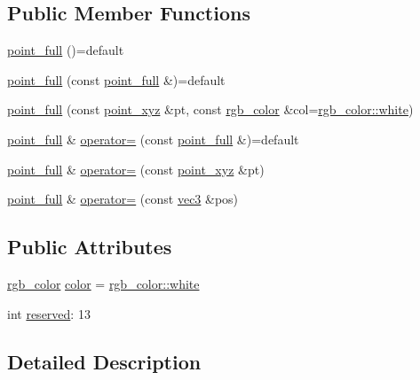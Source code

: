 \subsection*{Public Member Functions}
\begin{DoxyCompactItemize}
\item 
\hyperlink{structtlz_1_1point__full_ad3a06951660b913ae1241dec5958fab0}{point\+\_\+full} ()=default
\item 
\hyperlink{structtlz_1_1point__full_a4441cf6f34d2ec49a7029f5b409f3da9}{point\+\_\+full} (const \hyperlink{structtlz_1_1point__full}{point\+\_\+full} \&)=default
\item 
\hyperlink{structtlz_1_1point__full_aeb7460d34404faf1051efcc2fb42d9bb}{point\+\_\+full} (const \hyperlink{structtlz_1_1point__xyz}{point\+\_\+xyz} \&pt, const \hyperlink{structtlz_1_1rgb__color}{rgb\+\_\+color} \&col=\hyperlink{structtlz_1_1rgb__color_ad017cfc7d158ccb8ed15551b72eb232e}{rgb\+\_\+color\+::white})
\item 
\hyperlink{structtlz_1_1point__full}{point\+\_\+full} \& \hyperlink{structtlz_1_1point__full_a0c3b45811c6f1bba21215125a7ba0c63}{operator=} (const \hyperlink{structtlz_1_1point__full}{point\+\_\+full} \&)=default
\item 
\hyperlink{structtlz_1_1point__full}{point\+\_\+full} \& \hyperlink{structtlz_1_1point__full_a8a1bbee8c7a7c53259b797f61c7dece7}{operator=} (const \hyperlink{structtlz_1_1point__xyz}{point\+\_\+xyz} \&pt)
\item 
\hyperlink{structtlz_1_1point__full}{point\+\_\+full} \& \hyperlink{structtlz_1_1point__full_aae6515ae0f3d10bfd3baf918723e5f05}{operator=} (const \hyperlink{namespacetlz_ad0646d752ddb9d40d702d40cc6dc54a1}{vec3} \&pos)
\end{DoxyCompactItemize}
\subsection*{Public Attributes}
\begin{DoxyCompactItemize}
\item 
\hyperlink{structtlz_1_1rgb__color}{rgb\+\_\+color} \hyperlink{structtlz_1_1point__full_a9d4008e552791fe881aa1019de53423a}{color} = \hyperlink{structtlz_1_1rgb__color_ad017cfc7d158ccb8ed15551b72eb232e}{rgb\+\_\+color\+::white}
\item 
int \hyperlink{structtlz_1_1point__full_a46d3fc00cb551da3321bd631fd24d307}{reserved}\+: 13
\end{DoxyCompactItemize}


\subsection{Detailed Description}


